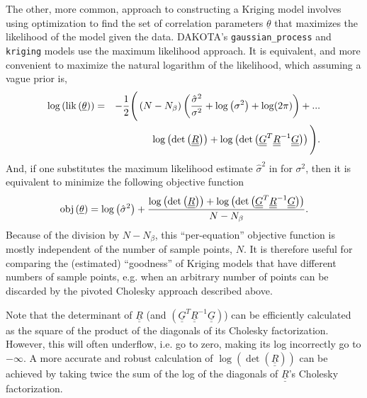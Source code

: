 The other, more common, approach to constructing a Kriging model 
involves using optimization to find the set of correlation parameters 
$\underline{\theta}$ that maximizes the likelihood of the model given 
the data.  DAKOTA's \texttt{gaussian\_process} and \texttt{kriging} models
use the maximum likelihood approach.  It is equivalent, and more
convenient to maximize the natural logarithm of the likelihood, which 
assuming a vague prior is,
\begin{eqnarray*}
\log\left({\rm lik}\left(\underline{\theta}\right)\right)&=&-\frac{1}{2}\Bigg(\left(N-N_{\beta}\right)\left(\frac{\hat{\sigma}^2}{\sigma^2}+\log\left(\sigma^2\right)+\log(2\pi)\right)+...\\
&& \hspace{0.4truein}\log\left(\det\left(\underline{\underline{R}}\right)\right)+\log\left(\det\left(\underline{\underline{G}}^T\underline{\underline{R}}^{-1}\underline{\underline{G}}\right)\right)\Bigg).
\end{eqnarray*}
And, if one substitutes the maximum likelihood estimate $\hat{\sigma}^2$ in
for $\sigma^2$, then it is equivalent to minimize the following objective 
function
\begin{displaymath}
{\rm obj}\left(\underline{\theta}\right)=\log\left(\hat{\sigma}^2\right)+\frac{\log\left(\det\left(\underline{\underline{R}}\right)\right)+\log\left(\det\left(\underline{\underline{G}}^T\underline{\underline{R}}^{-1}\underline{\underline{G}}\right)\right)}{N-N_{\beta}}.
\end{displaymath}
Because of the division by $N-N_{\beta}$, this ``per-equation'' objective 
function is mostly independent of the number of sample points, $N$.  It is 
therefore useful for comparing the (estimated) ``goodness'' of Kriging 
models that have different numbers of sample points, e.g. when an arbitrary
number of points can be discarded by the pivoted Cholesky approach described
above.\newline

Note that the determinant of $\underline{\underline{R}}$ (and 
$\left(\underline{\underline{G}}^T\underline{\underline{R}}^{-1}\underline{\underline{G}}\right)$) 
can be efficiently calculated as the square of the product of the diagonals 
of its Cholesky factorization.  However, this will often underflow, i.e. 
go to zero, making its log incorrectly go to $-\infty$.  A more accurate and 
robust calculation of 
$\log\left(\det\left(\underline{\underline{R}}\right)\right)$ 
can be achieved by taking twice the sum of the log of the 
diagonals of $\underline{\underline{R}}$'s Cholesky factorization. 
\newline

